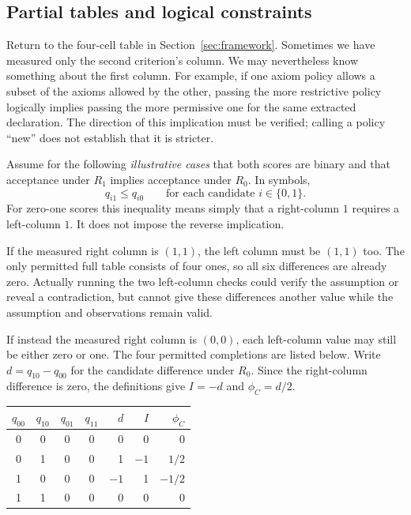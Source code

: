 

\subsection{Partial tables and logical constraints}
\label{sec:feasible-tables}

Return to the four-cell table in Section~\ref{sec:framework}. Sometimes we
have measured only the second criterion's column. We may nevertheless know
something about the first column. For example, if one axiom policy allows a
subset of the axioms allowed by the other, passing the more restrictive policy
logically implies passing the more permissive one for the same extracted
declaration. The direction of this implication must be verified; calling a
policy ``new'' does not establish that it is stricter.

Assume for the following \emph{illustrative cases} that both scores are binary
and that acceptance under $R_1$ implies acceptance under $R_0$. In symbols,
\[
q_{i1}\le q_{i0}\qquad\text{for each candidate }i\in\{0,1\}.
\]
For zero-one scores this inequality means simply that a right-column $1$
requires a left-column $1$. It does not impose the reverse implication.

If the measured right column is $(1,1)$, the left column must be $(1,1)$ too.
The only permitted full table consists of four ones, so all six differences
are already zero. Actually running the two left-column checks could verify
the assumption or reveal a contradiction, but cannot give these differences
another value while the assumption and observations remain valid.

If instead the measured right column is $(0,0)$, each left-column value may
still be either zero or one. The four permitted completions are listed below.
Write $d=q_{10}-q_{00}$ for the candidate difference under $R_0$. Since the
right-column difference is zero, the definitions give $I=-d$ and
$\phi_C=d/2$.

\begin{center}
\begin{tabular}{ccccrrr}
\toprule
$q_{00}$ & $q_{10}$ & $q_{01}$ & $q_{11}$ & $d$ & $I$ & $\phi_C$\\
\midrule
0 & 0 & 0 & 0 & 0 & 0 & 0\\
0 & 1 & 0 & 0 & 1 & $-1$ & $1/2$\\
1 & 0 & 0 & 0 & $-1$ & 1 & $-1/2$\\
1 & 1 & 0 & 0 & 0 & 0 & 0\\
\bottomrule
\end{tabular}
\end{center}

